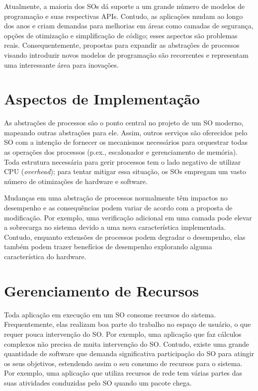 Atualmente, a maioria dos SOs dá suporte a um grande número de modelos de
programação e suas respectivas APIs. Contudo, as aplicações mudam ao longo dos
anos e criam demandas para melhorias em áreas como camadas de segurança, opções
de otimização e simplificação de código; esses aspectos são problemas reais.
Consequentemente, propostas para expandir as abstrações de processos visando
introduzir novos modelos de programação são recorrentes e representam uma
interessante área para inovações.

\section{Aspectos de Implementação}

As abstrações de processos são o ponto central no projeto de um SO moderno,
mapeando outras abstrações para ele. Assim, outros serviços são oferecidos pelo
SO com a intenção de fornecer os mecanismos necessários para orquestrar todas
as operações dos processos (p.ex., escalonador e gerenciamento de memória). Toda
estrutura necessária para gerir processos tem o lado negativo de utilizar CPU
(\emph{overhead}); para tentar mitigar essa situação, os SOs empregam um vasto
número de otimizações de hardware e software.

Mudanças em uma abstração de processos normalmente têm impactos no desempenho e
as consequências podem variar de acordo com a proposta de modificação. Por
exemplo, uma verificação adicional em uma camada pode elevar a sobrecarga no
sistema devido a uma nova característica implementada. Contudo, enquanto
extensões de processos podem degradar o desempenho, elas também podem trazer
benefícios de desempenho explorando alguma característica do hardware.

\section{Gerenciamento de Recursos}

Toda aplicação em execução em um SO consome recursos do sistema.
Frequentemente, elas realizam boa parte do trabalho no espaço de usuário, o que
requer pouca intervenção do SO. Por exemplo, uma aplicação que faz cálculos
complexos não precisa de muita intervenção do SO. Contudo, existe uma grande
quantidade de software que demanda significativa participação do SO para
atingir os seus objetivos, estendendo assim o seu consumo de recursos para o
sistema. Por exemplo, uma aplicação que utiliza recursos de rede tem várias
partes das suas atividades conduzidas pelo SO quando um pacote chega.


